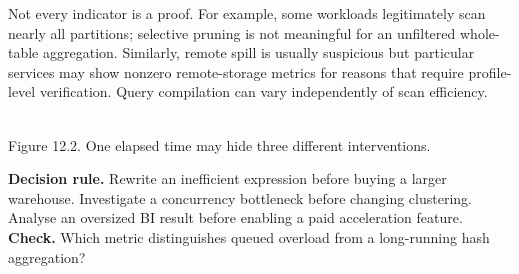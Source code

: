 \documentclass[11pt,twoside]{article}
\begin{document}
Not every indicator is a proof. For example, some workloads legitimately scan nearly all partitions; selective pruning is not meaningful for an unfiltered whole-table aggregation. Similarly, remote spill is usually suspicious but particular services may show nonzero remote-storage metrics for reasons that require profile-level verification. Query compilation can vary independently of scan efficiency.
\begin{center}\\{\fontsize{8}{9}\selectfont\color{inkgray}Figure 12.2. One elapsed time may hide three different interventions.}\end{center}
\textbf{Decision rule.} Rewrite an inefficient expression before buying a larger warehouse. Investigate a concurrency bottleneck before changing clustering. Analyse an oversized BI result before enabling a paid acceleration feature. \textbf{Check.} Which metric distinguishes queued overload from a long-running hash aggregation?
\newpage
\end{document}
